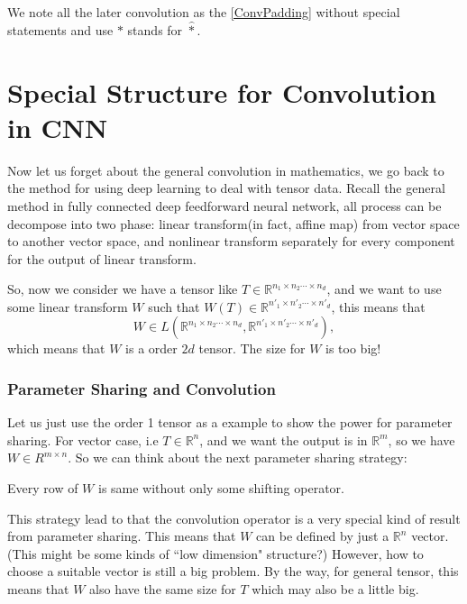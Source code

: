 \begin{remark}We note all the later convolution as the \eqref{ConvPadding} without special statements and use $\ast$ stands for $\hat{\ast}$.

\end{remark}



\section{Special Structure for Convolution in CNN}
Now let us forget about the general convolution in mathematics, we go back to the method for using deep learning to deal with tensor data. Recall the general method in fully connected deep feedforward neural network, all process can be decompose into two phase: linear transform(in fact, affine map) from vector space to another vector space,  and nonlinear transform separately for every component for the output of linear transform. 

So, now we consider we have a tensor like $T \in \mathbb{R}^{n_1\times n_2\cdots \times n_d}$, and we want to use some linear transform $W$ such that $W(T) \in  \mathbb{R}^{n'_1\times n'_2\cdots \times n'_d }$, this means that 
\begin{equation}
W \in  L(\mathbb{R}^{n_1\times n_2\cdots \times n_d},  \mathbb{R}^{n'_1\times n'_2\cdots \times n'_{d}}) ,
\end{equation}
which means that $W$ is a order $2d$ tensor. The size for $W$ is too big!

\subsubsection{Parameter Sharing and Convolution}
Let us just use the order 1 tensor as a example to show the power for parameter sharing. For vector case, i.e $T \in \mathbb{R}^{n}$, and we want the output is in $\mathbb{R}^m$, so we have $W \in R^{m\times n}$.  So we can think about the next parameter sharing strategy:
\begin{definition}
Every row of $W$ is same without only some shifting operator.  
\end{definition}
This strategy lead to that the convolution operator is a very special kind of  result from parameter sharing.  This means that $W$ can be defined by just a $\mathbb{R}^n$ vector.(This might be some kinds of ``low dimension" structure?) However, how to choose a suitable vector is still a big problem. By the way, for general tensor, this means that $W$ also have the same size for $T$ which may also be a little big.  

